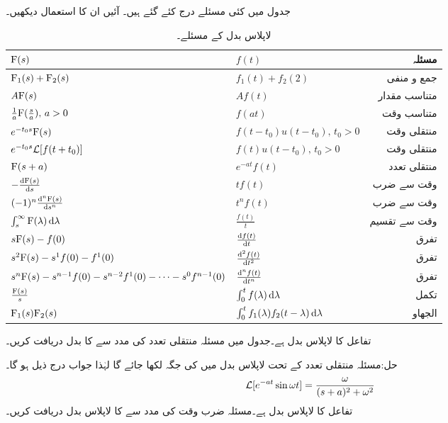 جدول  میں کئی مسئلے درج کئے گئے ہیں۔ آئیں ان کا استعمال دیکھیں۔
\begin{table}
\caption{لاپلاس بدل کے مسئلے۔}
\label{جدول_لاپلاس_مسئلے}
\centering
\begin{tabular}{l l r}
 ${{\textup{F}}}(s)$&$f(t)$ & مسئلہ\\  [2ex] 
\hline
 ${{\textup{F}}}_1(s)+{{\textup{F}}}_2(s)$&$f_1(t)+f_2(2)$ & جمع و منفی\\[2ex] 
 $A{{\textup{F}}}(s)$&$Af(t)$& متناسب مقدار\\[2ex] 
$\frac{1}{a}{{\textup{F}}}(\frac{s}{a}),\, a>0$ & $ f(at)$ & متناسب وقت\\[2ex] 
 $e^{-t_0 s}{{\textup{F}}}(s)$&$f(t-t_0) u(t-t_0), \, t_0>0$  & منتقلی وقت\\[2ex] 
 $e^{-t_0 s}\mathcal{L} [f(t+t_0)]$&$f(t) u(t-t_0), \, t_0>0$  & منتقلی وقت\\[2ex] 
${{\textup{F}}}(s+a)$& $e^{-at} f(t)$  & منتقلی تعدد\\[2ex] 
$-\frac{\dif \bF(s)}{\dif s}$ & $t f(t)$  & وقت سے ضرب\\[2ex] 
$(-1)^n\frac{\dif{^n} \bF(s)}{\dif s^n}$ & $t^n f(t)$  & وقت سے ضرب\\[2ex] 
$\int_s^{\infty} \bF(\lambda) \dif \lambda $ & $\frac{f(t)}{t}$  & وقت سے تقسیم\\[2ex] 
$s {{\textup{F}}}(s)-f(0)$ & $\frac{\dif f(t)}{\dif t}$  & تفرق\\[2ex] 
$s^2 {{\textup{F}}}(s)-s^1 f(0)- f^1(0)$ & $\frac{\dif{^2} f(t)}{\dif t^2}$  & تفرق\\[2ex] 
$s^n {{\textup{F}}}(s)-s^{n-1}f(0)-s^{n-2} f^1(0)-\cdots -s^0 f^{n-1}(0)$ & $\frac{\dif{^n} f(t)}{\dif t^n}$  & تفرق\\[2ex] 
$\frac{{{\textup{F}}}(s)}{s}$ & $\int_0^t f(\lambda) \dif \lambda$  & تکمل\\[2ex] 
${{\textup{F}}}_1(s) {{\textup{F}}}_2(s)$ & $\int_0^t f_1(\lambda) f_2(t-\lambda) \dif \lambda$  & الجھاو
\end{tabular}
\end{table}
تفاعل  کا لاپلاس بدل  ہے۔جدول  میں مسئلہ منتقلی تعدد کی مدد سے  کا بدل دریافت کریں۔

حل:مسئلہ منتقلی تعدد کے تحت لاپلاس بدل میں  کی جگہ   لکھا جائے گا لہٰذا جواب درج ذیل ہو گا۔
\begin{align*}
\mathcal{L}[e^{-at} \sin \omega t]=\frac{\omega}{(s+a)^2+\omega^2}
\end{align*}
تفاعل  کا لاپلاس بدل  ہے۔مسئلہ ضرب وقت کی مدد سے  کا لاپلاس بدل دریافت کریں۔

